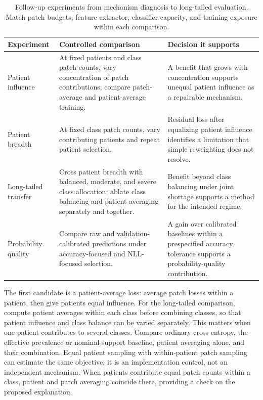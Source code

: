 \documentclass[11pt]{article}
\begin{document}
\begin{table}[ht]
\centering
\small
\renewcommand{\arraystretch}{1.15}
\begin{tabularx}{\textwidth}{@{}>{\raggedright\arraybackslash}p{}>{\raggedright\arraybackslash}X>{\raggedright\arraybackslash}X@{}}
\toprule
Experiment & Controlled comparison & Decision it supports \\
\midrule
Patient influence &
At fixed patients and class patch counts, vary concentration of patch contributions; compare patch-average and patient-average training. &
A benefit that grows with concentration supports unequal patient influence as a repairable mechanism. \\
Patient breadth &
At fixed class patch counts, vary contributing patients and repeat patient selection. &
Residual loss after equalizing patient influence identifies a limitation that simple reweighting does not resolve. \\
Long-tailed transfer &
Cross patient breadth with balanced, moderate, and severe class allocation; ablate class balancing and patient averaging separately and together. &
Benefit beyond class balancing under joint shortage supports a method for the intended regime. \\
Probability quality &
Compare raw and validation-calibrated predictions under accuracy-focused and NLL-focused selection. &
A gain over calibrated baselines within a prespecified accuracy tolerance supports a probability-quality contribution. \\
\bottomrule
\end{tabularx}
\caption{Follow-up experiments from mechanism diagnosis to long-tailed evaluation. Match patch budgets, feature extractor, classifier capacity, and training exposure within each comparison.}
\label{tab:follow-up}
\end{table}

\noindent The first candidate is a patient-average loss: average patch losses within a patient, then give patients equal influence. For the long-tailed comparison, compute patient averages within each class before combining classes, so that patient influence and class balance can be varied separately. This matters when one patient contributes to several classes. Compare ordinary cross-entropy, the effective prevalence or nominal-support baseline, patient averaging alone, and their combination. Equal patient sampling with within-patient patch sampling can estimate the same objective; it is an implementation control, not an independent mechanism. When patients contribute equal patch counts within a class, patient and patch averaging coincide there, providing a check on the proposed explanation.
\end{document}
